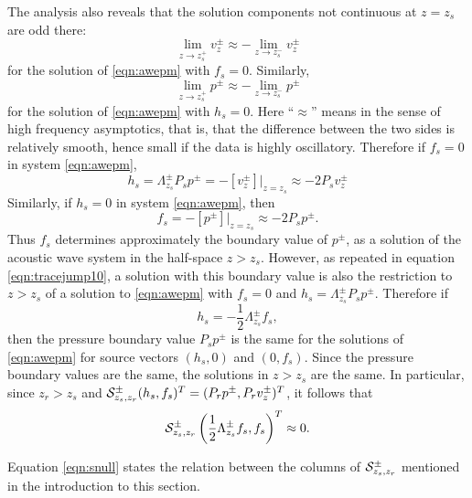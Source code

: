 The analysis also reveals that the solution components not continuous
at $z=z_s$ are odd there:
\begin{equation}
  \label{eqn:odd1}
  \lim_{z\rightarrow z_s^+} v^{\pm}_{z} \approx - \lim_{z\rightarrow z_s^-}
  v^{\pm}_{z}
\end{equation}
for the solution of \ref{eqn:awepm} with $f_s=0$.
Similarly, 
\begin{equation}
  \label{eqn:odd2}
  \lim_{z\rightarrow z_s^+} p^{\pm}\approx - \lim_{z\rightarrow z_s^-}
  p^{\pm}
\end{equation}
for the solution of \ref{eqn:awepm} with $h_s=0$. Here ``$\approx$''
means in the sense of high frequency asymptotics, that is, that the
difference between the two sides is relatively smooth, hence small if
the data is highly oscillatory. Therefore if $f_s=0$ in system \ref{eqn:awepm},
\begin{equation}
  h_s = \Lambda^{\pm}_{z_s}P_sp^{\pm} = -[v^{\pm}_{z}]|_{z=z_s} \approx -2
  P_sv^{\pm}_{z}
  \label{eqn:tracejump10}
\end{equation}
Similarly, if $h_s=0$ in system \ref{eqn:awepm}, then
\begin{equation}
  \label{eqn:tracejump20}
  f_s = -[p^{\pm}]|_{z=z_s} \approx -2 P_s p^{\pm}.
\end{equation}
Thus $f_s$ determines approximately the boundary value of $p^{\pm}$,
as a solution of the acoustic wave system in the half-space
$z>z_s$. However, as repeated in equation \ref{eqn:tracejump10}, a
solution with this boundary value is also the restriction to $z>z_s$
of a solution to \ref{eqn:awepm} with $f_s=0$ and $h_s=
\Lambda^{\pm}_{z_s}P_sp^{\pm}$. Therefore if
\begin{equation}
  \label{eqn:hfcondn}
  h_s =-\frac{1}{2}\Lambda^{\pm}_{z_s}f_s,
\end{equation}
then the pressure boundary value $P_sp^{\pm}$ is the
same for the solutions of \ref{eqn:awepm} for source vectors $(h_s,0)$
and $(0,f_s)$. Since the pressure boundary values are the same, the solutions
in $z>z_s$ are the same. In particular, since $z_r>z_s$ and ${\cal
  S}^{\pm}_{z_s,z_r}(h_s,f_s)^T = (P_rp^{\pm},P_rv^{\pm}_z)^T$, it follows
that
\begin{equation}
  \label{eqn:snull}
  {\cal S}^{\pm}_{z_s,z_r}\left(\frac{1}{2}\Lambda^{\pm}_{z_s}f_s,f_s\right)^T \approx 0.
\end{equation}

Equation \ref{eqn:snull} states the relation between the columns of $
{\cal S}^{\pm}_{z_s,z_r}$ mentioned in the introduction to this
section.



